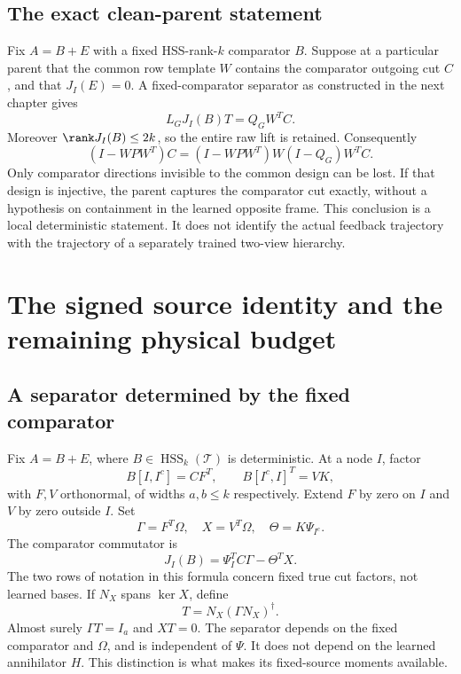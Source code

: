 \documentclass[11pt,oneside,openany,a4paper]{book}
\numberwithin{equation}{chapter}
\theoremstyle{definition}
\theoremstyle{remark}
\DeclareMathOperator{\HSS}{HSS}\DeclareMathOperator{\dist}{dist}
\begin{document}
\section{The exact clean-parent statement}

Fix $A=B+E$ with a fixed HSS-rank-$k$ comparator $B$.  Suppose at a
particular parent that the common row template $W$ contains the
comparator outgoing cut $C$, and that $J_I(E)=0$.  A fixed-comparator
separator as constructed in the next chapter gives
\[
 L_GJ_I(B)T=Q_GW^TC.
\]
Moreover $\rank J_I(B)\leq2k$, so the entire raw lift is retained.
Consequently
\begin{equation}
 (I-WPW^T)C
   =(I-WPW^T)W(I-Q_G)W^TC.
 \label{upd:eq:route-clean-invisible}
\end{equation}
Only comparator directions invisible to the common design can be lost.
If that design is injective, the parent captures the comparator cut
exactly, without a hypothesis on containment in the learned opposite
frame.  This conclusion is a local deterministic statement.  It does
not identify the actual feedback trajectory with the trajectory of a
separately trained two-view hierarchy.

\chapter{The signed source identity and the remaining physical budget}
\label{upd:chap:route-signed}

\section{A separator determined by the fixed comparator}

Fix $A=B+E$, where $B\in\HSS_k(\mathcal T)$ is deterministic.  At a
node $I$, factor
\[
 B[I,I^c]=CF^T,\qquad B[I^c,I]^T=VK,
\]
with $F,V$ orthonormal, of widths $a,b\leq k$ respectively.  Extend
$F$ by zero on $I$ and $V$ by zero outside $I$.  Set
\[
 \Gamma=F^T\Omega,\quad X=V^T\Omega,\quad
 \Theta=K\Psi_{I^c}.
\]
The comparator commutator is
\begin{equation}
 J_I(B)=\Psi_I^TC\Gamma-\Theta^TX.
 \label{upd:eq:route-comparator-J}
\end{equation}
The two rows of notation in this formula concern fixed true cut
factors, not learned bases.  If $N_X$ spans $\ker X$, define
\begin{equation}
 T=N_X(\Gamma N_X)^\dagger.
 \label{upd:eq:route-separator}
\end{equation}
Almost surely $\Gamma T=I_a$ and $XT=0$.  The separator depends on the
fixed comparator and $\Omega$, and is independent of $\Psi$.  It does
not depend on the learned annihilator $H$.  This distinction is what
makes its fixed-source moments available.
\end{document}
